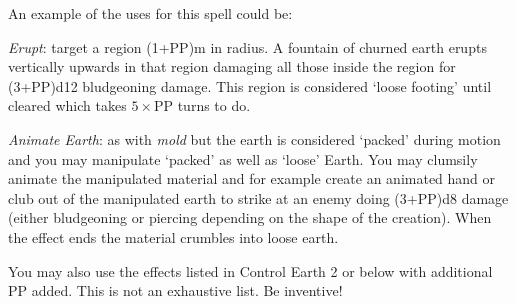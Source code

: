 \begin{multicols}{3}
{An example of the uses for this spell could be:
\begin{spellitemize}
\item {\it Erupt}: target a region (1+PP)m in radius. A fountain of churned earth erupts vertically upwards in that region\comma{} damaging all those inside the region for (3+PP)d12 bludgeoning damage. This region is considered `loose footing' until cleared\comma{} which takes $5 \times$PP turns to do. 
\item {\it Animate Earth}: as with {\it mold}\comma{} but the earth is considered `packed' during motion and you may manipulate `packed' as well as `loose' Earth. You may clumsily animate the manipulated material\comma{} and\comma{} for example\comma{} create an animated hand or club out of the manipulated earth to strike at an enemy\comma{} doing (3+PP)d8 damage (either bludgeoning or piercing\comma{} depending on the shape of the creation). When the effect ends\comma{} the material crumbles into loose earth. 
\end{spellitemize}
You may also use the effects listed in Control Earth 2 or below with \PPDifference{\DVAdpF}{\DVNovF} additional PP added. 
This is not an exhaustive list. Be inventive!}
\end{multicols}
